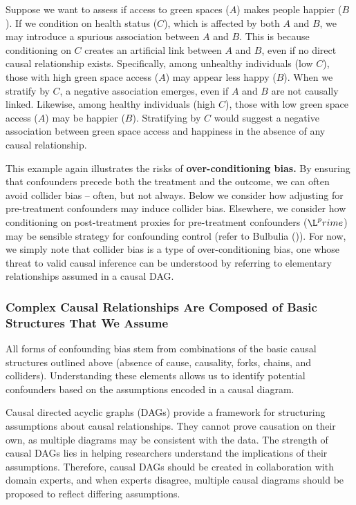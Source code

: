 \documentclass[
  singlecolumn]{article}
\begin{document}
Suppose we want to assess if access to green spaces (\(A\)) makes people
happier (\(B\)). If we condition on health status (\(C\)), which is
affected by both \(A\) and \(B\), we may introduce a spurious
association between \(A\) and \(B\). This is because conditioning on
\(C\) creates an artificial link between \(A\) and \(B\), even if no
direct causal relationship exists. Specifically, among unhealthy
individuals (low \(C\)), those with high green space access (\(A\)) may
appear less happy (\(B\)). When we stratify by \(C\), a negative
association emerges, even if \(A\) and \(B\) are not causally linked.
Likewise, among healthy individuals (high \(C\)), those with low green
space access (\(A\)) may be happier (\(B\)). Stratifying by \(C\) would
suggest a negative association between green space access and happiness
in the absence of any causal relationship.

This example again illustrates the risks of \textbf{over-conditioning
bias.} By ensuring that confounders precede both the treatment and the
outcome, we can often avoid collider bias -- often, but not always.
Below we consider how adjusting for pre-treatment confounders may induce
collider bias. Elsewhere, we consider how conditioning on post-treatment
proxies for pre-treatment confounders (\(\L^prime\)) may be sensible
strategy for confounding control (refer to Bulbulia
()). For now, we simply note that
collider bias is a type of over-conditioning bias, one whose threat to
valid causal inference can be understood by referring to elementary
relationships assumed in a causal DAG.

\subsubsection{Complex Causal Relationships Are Composed of Basic
Structures That We
Assume}\label{complex-causal-relationships-are-composed-of-basic-structures-that-we-assume}

All forms of confounding bias stem from combinations of the basic causal
structures outlined above (absence of cause, causality, forks, chains,
and colliders). Understanding these elements allows us to identify
potential confounders based on the assumptions encoded in a causal
diagram.

Causal directed acyclic graphs (DAGs) provide a framework for
structuring assumptions about causal relationships. They cannot prove
causation on their own, as multiple diagrams may be consistent with the
data. The strength of causal DAGs lies in helping researchers understand
the implications of their assumptions. Therefore, causal DAGs should be
created in collaboration with domain experts, and when experts disagree,
multiple causal diagrams should be proposed to reflect differing
assumptions.
\end{document}
